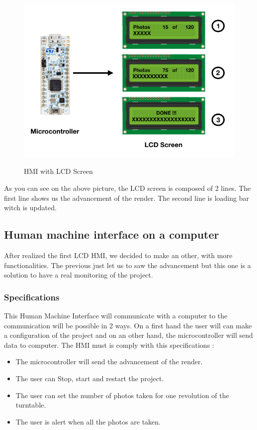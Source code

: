 \begin{figure}[h]
  \centering
  \includegraphics[scale=0.45]{img/LCD_IHM.png}\\%
  \caption{HMI with LCD Screen }
  \label{fig:LogoTachyssema}
\end{figure}

As you can see on the above picture, the LCD screen is composed of 2 lines. The first line shows us the advancement of the render. The second line is loading bar witch is updated. 
\subsection {Human machine interface on a computer  } 

After realized the first LCD HMI, we decided to make an other, with more functionalities. The previous just let us to saw the advancement but this one is a solution to have a real monitoring of the project.  

\subsubsection {Specifications  } 

This Human Machine Interface will communicate with a computer to the communication will be possible in 2 ways. On a first hand the user will can make a configuration of the project and on an other hand, the microcontroller will send data to computer. 
The HMI must is comply with this specifications : 
\newline
\begin{itemize}
  \item The microcontroller will send the advancement of the render.
  \item The user can Stop, start and restart the project.
  \item The user can set the number of photos taken for one revolution of the turntable.
  \item The user is alert when all the photos are taken. 
  \end{itemize}


